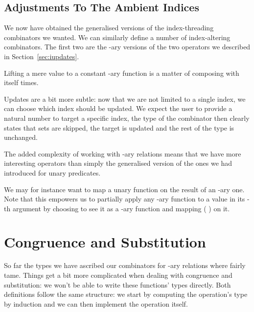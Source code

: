 {

\subsection{Adjustments To The Ambient Indices}

We now have obtained the generalised versions of the index-threading combinators
we wanted. We can similarly define a number of index-altering combinators. The
first two are the -ary versions of the two operators we described in
Section~\ref{sec:iupdates}.

Lifting a mere value to a constant -ary function is a matter of composing
 with itself  times.


Updates are a bit more subtle: now that we are not limited to a single index,
we can choose which index should be updated. We expect the user to provide a
natural number  to target a specific index, the type of the combinator
then clearly states that  sets are skipped, the target is updated and
the rest of the type is unchanged.


The added complexity of working with -ary relations means that we have
more interesting operators than simply the generalised version of the ones
we had introduced for unary predicates.

We may for instance want to map a unary function on the result of an -ary
one. Note that this empowers us to partially apply any -ary function to a
value  in its -th argument by choosing to see it as a -ary
function and mapping {(\AF{\_\$} )} on it.


\section{Congruence and Substitution}\label{sec:narycong}

So far the types we have ascribed our combinators for -ary relations
where fairly tame. Things get a bit more complicated when dealing with
congruence and substitution: we won't be able to write these functions' types
directly. Both definitions follow the same structure: we start by computing
the operation's type by induction and we can then implement the operation itself.

}
